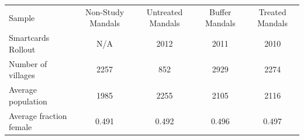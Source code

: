 \begin{tabular}{lcccc}
\toprule
Sample & Non-Study Mandals & Untreated Mandals & Buffer Mandals & Treated Mandals \\
Smartcards Rollout & N/A & 2012 & 2011 & 2010 \\
\midrule 
Number of villages & 2257 & 852 & 2929 & 2274\\
Average population & 1985 & 2255 & 2105 & 2116\\
Average fraction female & 0.491 & 0.492 & 0.496 & 0.497\\
\bottomrule
\end{tabular}
